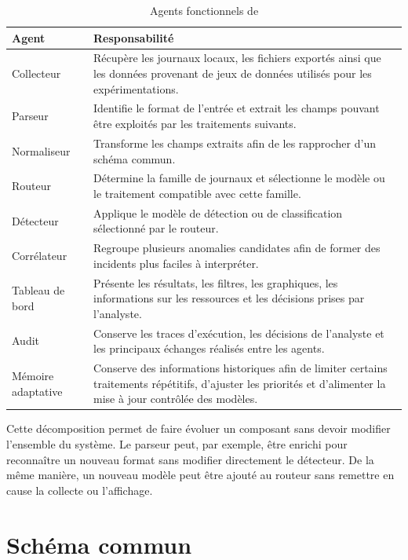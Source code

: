 \begin{table}[H]
\centering
\caption{Agents fonctionnels de \logminer{}}
\label{tab:agents}
\begin{tabularx}{\textwidth}{p{3cm}X}
\toprule
\textbf{Agent} & \textbf{Responsabilité} \tabularnewline
\midrule

Collecteur &
Récupère les journaux locaux, les fichiers exportés ainsi que les données provenant de jeux de données utilisés pour les expérimentations. \tabularnewline

Parseur &
Identifie le format de l'entrée et extrait les champs pouvant être exploités par les traitements suivants. \tabularnewline

Normaliseur &
Transforme les champs extraits afin de les rapprocher d'un schéma commun. \tabularnewline

Routeur &
Détermine la famille de journaux et sélectionne le modèle ou le traitement compatible avec cette famille. \tabularnewline

Détecteur &
Applique le modèle de détection ou de classification sélectionné par le routeur. \tabularnewline

Corrélateur &
Regroupe plusieurs anomalies candidates afin de former des incidents plus faciles à interpréter. \tabularnewline

Tableau de bord &
Présente les résultats, les filtres, les graphiques, les informations sur les ressources et les décisions prises par l'analyste. \tabularnewline

Audit &
Conserve les traces d'exécution, les décisions de l'analyste et les principaux échanges réalisés entre les agents. \tabularnewline

Mémoire adaptative &
Conserve des informations historiques afin de limiter certains traitements répétitifs, d'ajuster les priorités et d'alimenter la mise à jour contrôlée des modèles. \tabularnewline

\bottomrule
\end{tabularx}
\end{table}

Cette décomposition permet de faire évoluer un composant sans devoir modifier l'ensemble du système. Le parseur peut, par exemple, être enrichi pour reconnaître un nouveau format sans modifier directement le détecteur. De la même manière, un nouveau modèle peut être ajouté au routeur sans remettre en cause la collecte ou l'affichage.

\section{Schéma commun}

